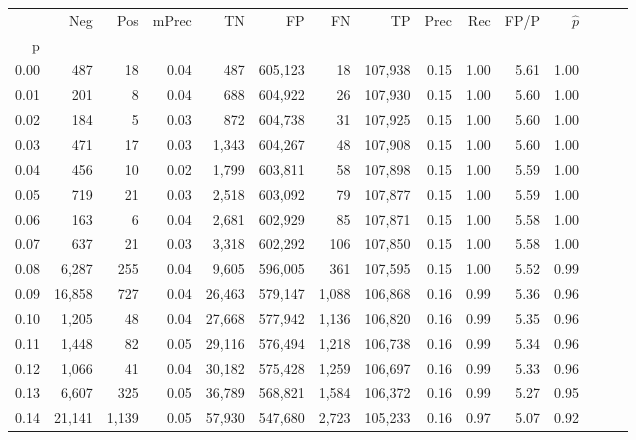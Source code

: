 \begin{tabular}{rrrrrrrrrrrrrrr}
\toprule
{} &     Neg &    Pos & mPrec &       TN &       FP &       FN &       TP &  Prec &   Rec &  FP/P & $\hat{p}$ \\
p    &         &        &       &          &          &          &          &       &       &       &           \\
\midrule
0.00 &     487 &     18 &  0.04 &      487 &  605,123 &       18 &  107,938 &  0.15 &  1.00 &  5.61 &      1.00 \\
0.01 &     201 &      8 &  0.04 &      688 &  604,922 &       26 &  107,930 &  0.15 &  1.00 &  5.60 &      1.00 \\
0.02 &     184 &      5 &  0.03 &      872 &  604,738 &       31 &  107,925 &  0.15 &  1.00 &  5.60 &      1.00 \\
0.03 &     471 &     17 &  0.03 &    1,343 &  604,267 &       48 &  107,908 &  0.15 &  1.00 &  5.60 &      1.00 \\
0.04 &     456 &     10 &  0.02 &    1,799 &  603,811 &       58 &  107,898 &  0.15 &  1.00 &  5.59 &      1.00 \\
0.05 &     719 &     21 &  0.03 &    2,518 &  603,092 &       79 &  107,877 &  0.15 &  1.00 &  5.59 &      1.00 \\
0.06 &     163 &      6 &  0.04 &    2,681 &  602,929 &       85 &  107,871 &  0.15 &  1.00 &  5.58 &      1.00 \\
0.07 &     637 &     21 &  0.03 &    3,318 &  602,292 &      106 &  107,850 &  0.15 &  1.00 &  5.58 &      1.00 \\
0.08 &   6,287 &    255 &  0.04 &    9,605 &  596,005 &      361 &  107,595 &  0.15 &  1.00 &  5.52 &      0.99 \\
0.09 &  16,858 &    727 &  0.04 &   26,463 &  579,147 &    1,088 &  106,868 &  0.16 &  0.99 &  5.36 &      0.96 \\
0.10 &   1,205 &     48 &  0.04 &   27,668 &  577,942 &    1,136 &  106,820 &  0.16 &  0.99 &  5.35 &      0.96 \\
0.11 &   1,448 &     82 &  0.05 &   29,116 &  576,494 &    1,218 &  106,738 &  0.16 &  0.99 &  5.34 &      0.96 \\
0.12 &   1,066 &     41 &  0.04 &   30,182 &  575,428 &    1,259 &  106,697 &  0.16 &  0.99 &  5.33 &      0.96 \\
0.13 &   6,607 &    325 &  0.05 &   36,789 &  568,821 &    1,584 &  106,372 &  0.16 &  0.99 &  5.27 &      0.95 \\
0.14 &  21,141 &  1,139 &  0.05 &   57,930 &  547,680 &    2,723 &  105,233 &  0.16 &  0.97 &  5.07 &      0.92 \\

\end{tabular}
